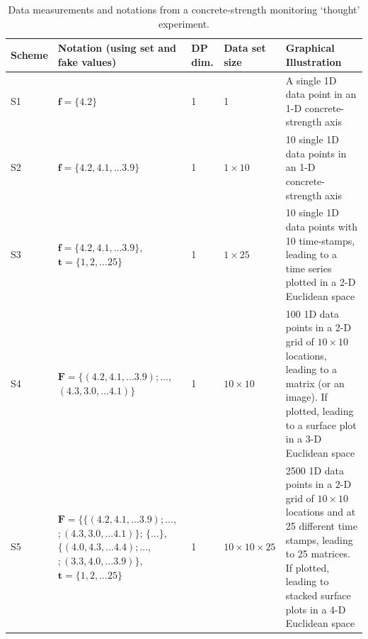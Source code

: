 \documentclass[12pt]{article}
\begin{document}



\begin{table}[ht]
\begin{tabular}{|l|p{2in}|l|l|p{2in}|} %
\hline
Scheme & Notation (using set and fake values)                                                                                                                & DP dim. & Data set size             & Graphical Illustration                                                                                                                                                                      \\ \hline
S1     & $\bm{f}=\{4.2\}$                                                                                                    & 1       & 1                         & A single 1D data point in an 1-D concrete-strength axis                                                                                                                                     \\ \hline
S2     & $\bm{f} =\{4.2, 4.1,... 3.9\}$                                                                                      & 1       & $1\times 10$                        & 10 single 1D data points in an 1-D concrete-strength axis                                                                                                                                   \\ \hline
S3     & $\bm{f} =\{4.2, 4.1,... 3.9\}$, $\bm{t} =\{1, 2,... 25\}$                                                       & 1       & $1 \times 25$             & 10 single 1D data points with 10 time-stamps, leading to a time series plotted in a 2-D Euclidean space                                                                                     \\ \hline
S4     & $\bm{F} =\{(4.2, 4.1,... 3.9); ...$, $(4.3,3.0, ... 4.1)\}$                                                           & 1       & $ 10 \times 10$           & 100 1D data points in a 2-D grid of $10\times 10$ locations, leading to a matrix (or an image). If plotted, leading to a surface plot in a 3-D Euclidean space                              \\ \hline
S5     & $\bm{F} =\big\{ \{(4.2, 4.1,... 3.9); ...$, $; (4.3,3.0, ... 4.1)\}$; $\{...\}$, $\{(4.0, 4.3,... 4.4); ...$, $; (3.3,4.0, ... 3.9) \big\}$, $\bm{t} =\{1, 2,... 25\}$ & 1       & $ 10 \times 10 \times 25$ & 2500 1D data points in a 2-D grid of $10\times 10$ locations and at 25 different time stamps, leading to 25 matrices. If plotted, leading to stacked surface plots in a 4-D Euclidean space \\ \hline
\end{tabular}
\caption{Data measurements and notations from a concrete-strength monitoring `thought' experiment. }
\label{Tab01}
\end{table}
\end{document}
